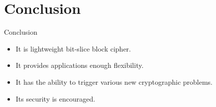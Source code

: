 \section{Conclusion}

\begin{frame}{Conclusion}
\begin{block}{}
\begin{itemize}
    \item It is lightweight bit-slice block cipher.
    \item It provides applications enough flexibility.
    \item It has the ability to trigger various new cryptographic problems.
    \item Its security is encouraged.
\end{itemize}
    
\end{block}
\end{frame}
